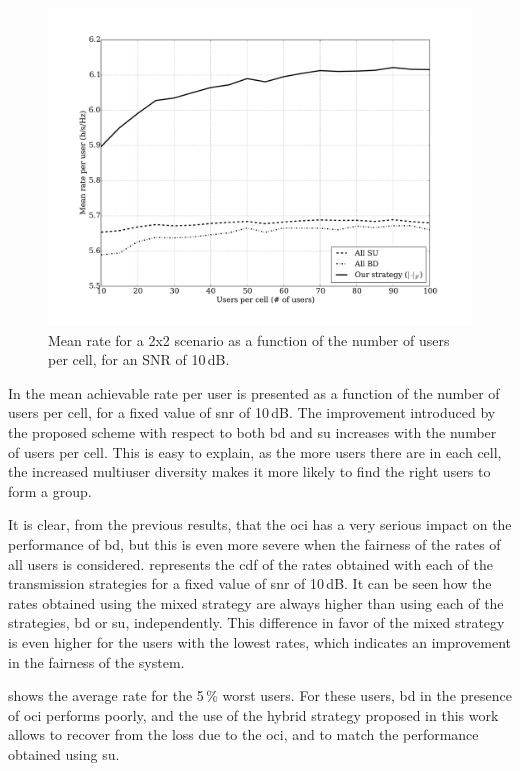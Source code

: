 \begin{figure}[t]
\centering
\includegraphics[width=0.75\columnwidth]{./12.simple_threshold_scheduling/img/mean_rate_vs_users_02x02_s10}
\caption{Mean rate for a 2x2 scenario as a function of the number of users per cell, for an SNR of 10\,dB.}
\label{fig:mean_rate_vs_users}
\end{figure}

In  the mean achievable rate per user is presented as a function of the number of users per cell, for a fixed value of \gls{snr} of
10\,dB. The improvement introduced by the proposed scheme with respect to both
\gls{bd} and \gls{su} increases with the number of users per cell. This is easy
to explain, as the more users there are in each cell, the increased multiuser 
diversity makes it more likely to find the right users to form a group.

It is clear, from the previous results, that the \gls{oci} has a very serious
impact on the performance of \gls{bd}, but this is even more severe when the
fairness of the rates of all users is considered. 
represents the \gls{cdf} of the rates obtained with each of the transmission
strategies for a fixed value of \gls{snr} of 10\,dB. It can be seen how the
rates obtained using the mixed strategy are always higher than using each of the
strategies, \gls{bd} or \gls{su}, independently. This difference in favor of the
mixed strategy is even higher for the users with the lowest rates, which
indicates an improvement in the fairness of the system.

 shows the average rate for the 5\,\% worst users. For
these users, \gls{bd} in the presence of \gls{oci} performs poorly, and the use
of the hybrid strategy proposed in this work allows to recover from the loss due
to the \gls{oci}, and to match the performance obtained using \gls{su}.

